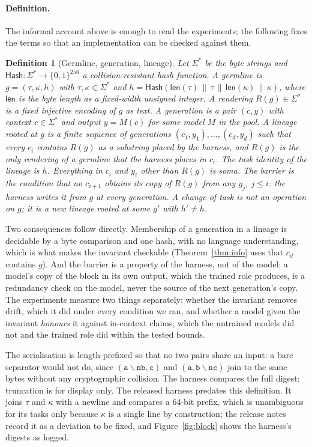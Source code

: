 \documentclass[11pt]{article}
\newtheorem{definition}{Definition}
\begin{document}
\paragraph{Definition.} The informal account above is enough to read the experiments; the following fixes the terms so that an implementation can be checked against them.

\begin{definition}[Germline, generation, lineage]\label{def:germline}
Let $\Sigma^*$ be the byte strings and $\mathsf{Hash}:\Sigma^*\to\{0,1\}^{256}$ a collision-resistant hash function. A \emph{germline} is $g=(\tau,\kappa,h)$ with $\tau,\kappa\in\Sigma^*$ and $h=\mathsf{Hash}(\mathsf{len}(\tau)\,\|\,\tau\,\|\,\mathsf{len}(\kappa)\,\|\,\kappa)$, where $\mathsf{len}$ is the byte length as a fixed-width unsigned integer. A \emph{rendering} $R(g)\in\Sigma^*$ is a fixed injective encoding of $g$ as text. A \emph{generation} is a pair $(c,y)$ with context $c\in\Sigma^*$ and output $y=M(c)$ for some model $M$ in the pool. A \emph{lineage} rooted at $g$ is a finite sequence of generations $(c_1,y_1),\ldots,(c_d,y_d)$ such that every $c_i$ contains $R(g)$ as a substring placed by the harness, and $R(g)$ is the only rendering of a germline that the harness places in $c_i$. The \emph{task identity} of the lineage is $h$. Everything in $c_i$ and $y_i$ other than $R(g)$ is \emph{soma}. The \emph{barrier} is the condition that no $c_{i+1}$ obtains its copy of $R(g)$ from any $y_j$, $j\le i$: the harness writes it from $g$ at every generation. A change of task is not an operation on $g$; it is a new lineage rooted at some $g'$ with $h'\ne h$.
\end{definition}

Two consequences follow directly. Membership of a generation in a lineage is decidable by a byte comparison and one hash, with no language understanding, which is what makes the invariant checkable (Theorem~\ref{thm:info} uses that $c_d$ contains $g$). And the barrier is a property of the harness, not of the model: a model's copy of the block in its own output, which the trained role produces, is a redundancy check on the model, never the source of the next generation's copy. The experiments measure two things separately: whether the invariant removes drift, which it did under every condition we ran, and whether a model given the invariant \emph{honours} it against in-context claims, which the untrained models did not and the trained role did within the tested bounds.

The serialisation is length-prefixed so that no two pairs share an input: a bare separator would not do, since $(\mathtt{a\backslash nb},\mathtt{c})$ and $(\mathtt{a},\mathtt{b\backslash nc})$ join to the same bytes without any cryptographic collision. The harness compares the full digest; truncation is for display only. The released harness predates this definition. It joins $\tau$ and $\kappa$ with a newline and compares a 64-bit prefix, which is unambiguous for its tasks only because $\kappa$ is a single line by construction; the release notes record it as a deviation to be fixed, and Figure~\ref{fig:block} shows the harness's digests as logged.
\end{document}
